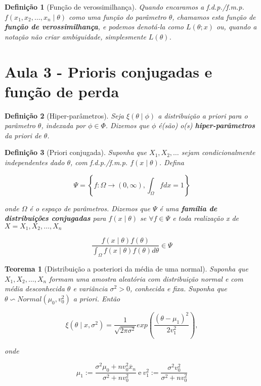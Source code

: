 \documentclass{article}
\newtheorem{theorem}{Teorema}
\newtheorem{definition}{Definição}
\begin{document}
\begin{definition}[Função de verossimilhança]
Quando encaramos a f.d.p./f.m.p. $f(x_1, x_2, \ldots, x_n \mid \theta)$ como uma função do parâmetro $\theta$, chamamos esta função de \textbf{função de verossimilhança}, e podemos denotá-la como $L(\theta; x)$ ou, quando a notação não criar ambiguidade, simplesmente $L(\theta)$.
\end{definition}

\section*{Aula 3 - Prioris conjugadas e função de perda}
\begin{definition}[Hiper-parâmetros]
Seja $\xi(\theta \mid \phi)$ a distribuição a priori para o parâmetro $\theta$, indexada por $\phi \in \Phi$. Dizemos que $\phi$ é(são) o(s) \textbf{hiper-parâmetros} da priori de $\theta$.
\end{definition}

\begin{definition}[Priori conjugada]
Suponha que $X_1, X_2, \ldots$ sejam condicionalmente independentes dado $\theta$, com f.d.p./f.m.p. $f(x\mid\theta)$. Defina

\begin{equation}
\Psi = \left \{ f: \Omega \rightarrow (0, \infty), \int_\Omega f dx = 1 \right \}
\end{equation}

onde $\Omega$ é o espaço de parâmetros. Dizemos que $\Psi$ é uma \textbf{família de distribuições conjugadas} para $f(x \mid \theta)$ se $\forall f \in \Psi$ e toda realização x de $X = X_1, X_2, \ldots, X_n$

\begin{equation}
\frac{f(x\mid\theta)f(\theta)}{\int_\Omega f(x\mid\theta)f(\theta) d \theta} \in \Psi
\end{equation}
\end{definition}

\begin{theorem}[Distribuição a posteriori da média de uma normal]
Suponha que $X_1, X_2, \ldots, X_n$ formam uma amostra aleatória com distribuição normal e com média desconhecida $\theta$ e variância $\sigma^2 > 0$, conhecida e fixa. Suponha que $\theta \backsim Normal(\mu_0, v_0^2)$ a priori. Então

\begin{equation}
\xi (\theta \mid x, \sigma^2) = \frac{1}{\sqrt{2 \pi \sigma^2}} exp \left (\frac{(\theta - \mu_1)^2}{2v_1^2}\right ),
\end{equation}

onde

\begin{equation}
\mu_1 := \frac{\sigma^2 \mu_0 + n v_0^2 \overline{x}_n}{\sigma^2 + n v_ 0^2} \ \text{e} \ v_1^2 := \frac{\sigma^2 v_0^2}{\sigma^2 + n v_0^2}
\end{equation}
\end{theorem}
\end{document}
